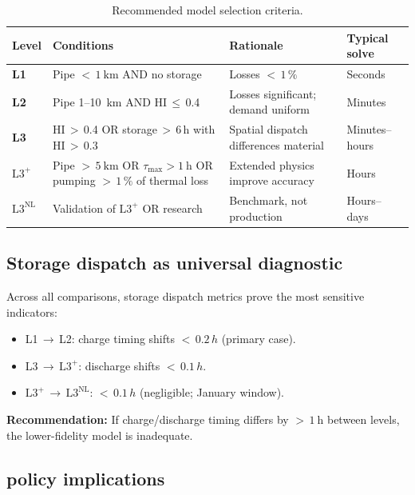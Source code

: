 \documentclass[review,3p]{elsarticle}
\newcommand{\Lplus}{\mathrm{L3}^{+}}
\newcommand{\Lnl}{\mathrm{L3}^{\mathrm{NL}}}
\begin{document}
\begin{table}[!htbp]
\centering
\caption{Recommended model selection criteria.}
\label{tab:criteria}
\begin{tabular}{@{} l p{6.0cm} p{3.5cm} l @{}}
\toprule
Level & Conditions & Rationale & Typical solve \\
\midrule
\textbf{L1}
  & Pipe ${<}\,\SI{1}{\kilo\metre}$ AND no storage
  & Losses ${<}\,1\,\%$
  & Seconds \\[6pt]
\textbf{L2}
  & Pipe 1--\SI{10}{\kilo\metre} AND HI\,$\leq$\,0.4
  & Losses significant; demand uniform
  & Minutes \\[6pt]
\textbf{L3}
  & HI\,$>$\,0.4 OR storage\,$>$\,6\,h with HI\,$>$\,0.3
  & Spatial dispatch differences material
  & Minutes--hours \\[6pt]
\textbf{$\Lplus$}
  & Pipe ${>}\,\SI{5}{\kilo\metre}$ OR $\tau_{\max} > \SI{1}{\hour}$
    OR pumping ${>}\,1\,\%$ of thermal loss
  & Extended physics improve accuracy
  & Hours \\[6pt]
\textbf{$\Lnl$}
  & Validation of $\Lplus$ OR research
  & Benchmark, not production
  & Hours--days \\
\bottomrule
\end{tabular}
\end{table}

\subsection{Storage dispatch as universal diagnostic}
\label{sec:disc_storage}

Across all comparisons, storage dispatch metrics prove the most
sensitive indicators:
%
\begin{itemize}[nosep]
  \item L1\,$\to$\,L2: charge timing shifts ${<}\,0.2\,h$ (primary case).
  \item L3\,$\to$\,$\Lplus$: discharge shifts ${<}\,0.1\,h$.
  \item $\Lplus$\,$\to$\,$\Lnl$:
        ${<}\,0.1\,h$ (negligible; January window).
\end{itemize}

\textbf{Recommendation:} If charge/discharge timing differs by
${>}\,\SI{1}{\hour}$ between levels, the lower-fidelity model is
inadequate.

\subsection{ policy implications}
\label{sec:disc_co2}
\end{document}
